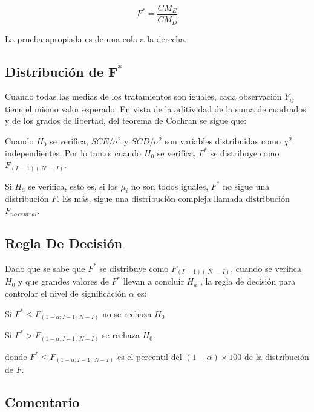 \documentclass[]{book}
\theoremstyle{definition}
\theoremstyle{definition}
\theoremstyle{definition}
\theoremstyle{remark}
\begin{document}
\[
F^{*} = \frac{CM_E}{CM_D}
\]

La prueba apropiada es de una cola a la derecha.

\hypertarget{distribucion-de-mathbffmathbf}{%
\subsection{\texorpdfstring{Distribución de
\(\mathbf{F}^{\mathbf{*}}\)}{Distribución de \textbackslash{}mathbf\{F\}\^{}\{\textbackslash{}mathbf\{*\}\}}}\label{distribucion-de-mathbffmathbf}}

Cuando todas las medias de los tratamientos son iguales, cada
observación \(Y_{ij}\) tiene el mismo valor esperado. En vista de la
aditividad de la suma de cuadrados y de los grados de libertad, del
teorema de Cochran se sigue que:

Cuando \(H_{0}\) se verifica, \(SCE/\sigma^{2}\) y \(SCD/\sigma^{2}\)
son variables distribuidas como \(\chi^{2}\) independientes. Por lo
tanto: cuando \(H_{0}\) se verifica, \(F^{*}\) se distribuye como
\(F_{\left( I - \ 1 \right)\left( \ N\  - \ I \right)}\).

Si \(H_{a}\) se verifica, esto es, si los \(\mu_{i}\) no son todos
iguales, \(F^{*}\) no sigue una distribución \(F\). Es más, sigue una
distribución compleja llamada distribución \(F_{ no\ central}\).

\hypertarget{regla-de-decision}{%
\subsection{Regla De Decisión}\label{regla-de-decision}}

Dado que se sabe que \(F^{*}\) se distribuye como
\(F_{\left( I - \ 1 \right)\left( \ N\  - \ I \right)}\). cuando se
verifica \(H_{0}\) y que grandes valores de \(F^{*}\) llevan a concluir
\(H_{a}\) , la regla de decisión para controlar el nivel de
significación \(\alpha\) es:

Si \(F^{*} \leq F_{(1 - \alpha;I - 1;\ N - I)}\) no se rechaza
\(H_{0}\).

Si \(F^{*} > F_{(1 - \alpha;I - 1;\ N - I)}\) se rechaza \(H_{0}\).

donde \(F^{*} \leq F_{(1 - \alpha;I - 1;\ N - I)}\) es el percentil del
\(\left( 1 - \alpha \right) \times 100\) de la distribución de \(F\).

\hypertarget{comentario}{%
\subsection{Comentario}\label{comentario}}
\end{document}

